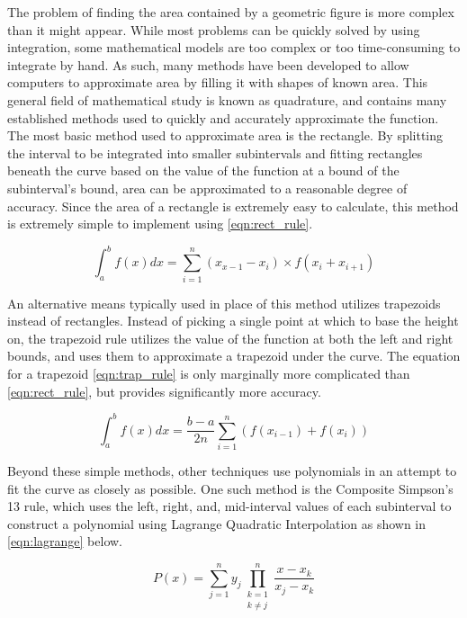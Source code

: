 \documentclass{paper}
\author{Grant Lemons}
\begin{document}

The problem of finding the area contained by a geometric figure is more complex than it might appear.
While most problems can be quickly solved by using integration, some mathematical models are too complex or too time-consuming to integrate by hand.
As such, many methods have been developed to allow computers to approximate area by filling it with shapes of known area.
This general field of mathematical study is known as quadrature, and contains many established methods used to quickly and accurately approximate the function.
The most basic method used to approximate area is the rectangle.
By splitting the interval to be integrated into smaller subintervals and fitting rectangles beneath the curve based on the value of the function at a bound of the subinterval's bound, area can be approximated to a reasonable degree of accuracy.
Since the area of a rectangle is extremely easy to calculate, this method is extremely simple to implement using \eqref{eqn:rect_rule}.

\begin{equation}
    \label{eqn:rect_rule}
    \int_a^b f(x) dx = \sum_{i=1}^n (x_{x-1} - x_i) \times f(x_i + x_{i+1})
\end{equation}
 
An alternative means typically used in place of this method utilizes trapezoids instead of rectangles.
Instead of picking a single point at which to base the height on, the trapezoid rule utilizes the value of the function at both the left and right bounds, and uses them to approximate a trapezoid under the curve.
The equation for a trapezoid \eqref{eqn:trap_rule} is only marginally more complicated than \eqref{eqn:rect_rule}, but provides significantly more accuracy.

\begin{equation}
    \label{eqn:trap_rule}
    \int_a^b f(x) dx = \dfrac{b - a}{2n} \sum_{i=1}^n (f(x_{i-1})+f(x_i))
\end{equation}

Beyond these simple methods, other techniques use polynomials in an attempt to fit the curve as closely as possible.
One such method is the Composite Simpson's 13 rule, which uses the left, right, and, mid-interval values of each subinterval to construct a polynomial using Lagrange Quadratic Interpolation as shown in \eqref{eqn:lagrange} below.

\begin{equation}
    \label{eqn:lagrange}
    P(x) = \sum_{j=1}^n y_j \prod_{\substack{k = 1 \\ k \neq j}}^n \dfrac{x - x_k}{x_j - x_k}
\end{equation}
\end{document}
